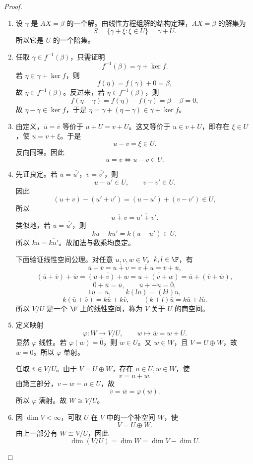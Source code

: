 \begin{proof}
	\begin{enumerate}
		\item 设 $\gamma$ 是 $AX=\beta$ 的一个解。由线性方程组解的结构定理，$AX=\beta$ 的解集为
		\[
		S=\{\gamma+\xi:\xi\in U\}=\gamma+U.
		\]
		所以它是 $U$ 的一个陪集。
		
		\item 任取 $\gamma\in f^{-1}(\beta)$，只需证明
		\[
		f^{-1}(\beta)=\gamma+
		\ker f.
		\]
		若 $\eta\in\gamma+
		\ker f$，则
		\[
		f(\eta)=f(\gamma)+0=\beta,
		\]
		故 $\eta\in f^{-1}(\beta)$。反过来，若 $\eta\in f^{-1}(\beta)$，则
		\[
		f(\eta-
		\gamma)=f(\eta)-f(\gamma)=\beta-
		\beta=0,
		\]
		故 $\eta-
		\gamma\in\ker f$，于是 $\eta=\gamma+(\eta-
		\gamma)\in\gamma+
		\ker f$。
		
		\item 由定义，$\overline u=\overline v$ 等价于 $u+U=v+U$。这又等价于 $u\in v+U$，即存在 $\xi\in U$，使 $u=v+\xi$。于是
		\[
		u-v=\xi\in U.
		\]
		反向同理。因此
		\[
		\overline u=\overline v
		\Longleftrightarrow
		u-v\in U.
		\]
		
		\item 先证良定。若 $\overline u=\overline{u'}$，$\overline v=\overline{v'}$，则
		\[
		u-u'\in U,
		\qquad
		v-v'\in U.
		\]
		因此
		\[
		(u+v)-(u'+v')=(u-u')+(v-v')\in U,
		\]
		所以
		\[
		\overline{u+v}=\overline{u'+v'}.
		\]
		类似地，若 $\overline u=\overline{u'}$，则
		\[
		ku-ku'=k(u-u')\in U,
		\]
		所以 $\overline{ku}=\overline{ku'}$。故加法与数乘均良定。
		
		下面验证线性空间公理。对任意 $u,v,w\in V$，$k,l\in\F$，有
		\[
		\overline u+
		\overline v=\overline{u+v}=\overline{v+u}=\overline v+
		\overline u,
		\]
		\[
		(\overline u+
		\overline v)+\overline w=
		\overline{(u+v)+w}=\overline{u+(v+w)}=
		\overline u+(\overline v+
		\overline w),
		\]
		\[
		\overline 0+
		\overline u=\overline u,
		\qquad
		\overline u+\overline{-u}=\overline0,
		\]
		\[
		1\overline u=\overline u,
		\qquad
		k(l\overline u)=(kl)\overline u,
		\]
		\[
		k(\overline u+
		\overline v)=k\overline u+k\overline v,
		\qquad
		(k+l)\overline u=k\overline u+l\overline u.
		\]
		所以 $V/U$ 是一个 $\F$ 上的线性空间，称为 $V$ 关于 $U$ 的商空间。
		
		\item 定义映射
		\[
		\varphi:W\to V/U,
		\qquad
		w\longmapsto \overline w=w+U.
		\]
		显然 $\varphi$ 线性。若 $\varphi(w)=\overline0$，则 $w\in U$。又 $w\in W$，且 $V=U\oplus W$，故 $w=0$。所以 $\varphi$ 单射。
		
		任取 $\overline v\in V/U$。由于 $V=U\oplus W$，存在 $u\in U,w\in W$，使
		\[
		v=u+w.
		\]
		由第三部分，$v-w=u\in U$，故
		\[
		\overline v=\overline w=\varphi(w).
		\]
		所以 $\varphi$ 满射。故 $W\cong V/U$。
		
		\item 因 $\dim V<\infty$，可取 $U$ 在 $V$ 中的一个补空间 $W$，使
		\[
		V=U\oplus W.
		\]
		由上一部分有 $W\cong V/U$，因此
		\[
		\dim(V/U)=\dim W=\dim V-
		\dim U.
		\]
	\end{enumerate}
\end{proof}
